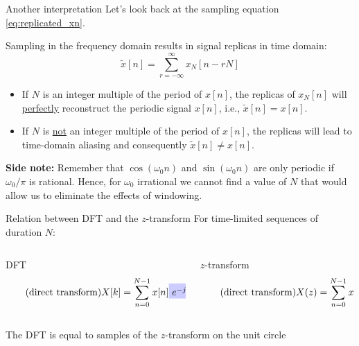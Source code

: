 \documentclass[10pt, handout]{beamer}
\begin{document}
%
\begin{frame}{Another interpretation}
	Let's look back at the sampling equation \eqref{eq:replicated_xn}. 

	Sampling in the frequency domain results in signal replicas in time domain:
	\begin{equation*}
	\tilde{x}[n] = \sum_{r=-\infty}^\infty x_N[n-rN]
	\end{equation*}
	
	\begin{itemize}
		\item If $N$ is an integer multiple of the period of $x[n]$, the replicas of $x_N[n]$ will \underline{perfectly} reconstruct the periodic signal $x[n]$, i.e., $\tilde{x}[n] = x[n]$.
		\item If $N$ is \underline{not} an integer multiple of the period of $x[n]$, the replicas will lead to time-domain aliasing and consequently $\tilde{x}[n]\neq x[n]$.
	\end{itemize}
	
	\vspace{0.25cm}	
	\textbf{Side note:} Remember that $\cos(\omega_0n)$ and $\sin(\omega_0n)$ are only periodic if $\omega_0/\pi$ is rational. Hence, for $\omega_0$ irrational we cannot find a value of $N$ that would allow us to eliminate the effects of windowing.
\end{frame}


%
\begin{frame}{Relation between DFT and the $z$-transform}
For time-limited sequences of duration $N$:
\vspace{-0.3cm}
\begin{columns}[t]
\begin{column}{0.5\textwidth}
	\begin{block}{DFT}
		\vspace{-0.3cm}
		\begin{equation} \tag{direct transform}
		X[k] = \sum_{n=0}^{N-1} x[n]\tikz[baseline]{
			\node[fill=blue!20,anchor=base] (t1) {$e^{-j(2\pi/N)kn}$};
		}
		\end{equation}
	\end{block}
\end{column}
\begin{column}{0.5\textwidth}
	\begin{block}{$z$-transform}
		\vspace{-0.3cm}
		\begin{equation} \tag{direct transform}
		X(z) = \sum_{n=0}^{N-1} x[n]\tikz[baseline]{
			\node[fill=blue!20,anchor=base] (t1) {$z^{-n}$};
		}
		\end{equation}
	\end{block}
\end{column}
\end{columns}
\vspace{0.5cm}
The DFT is equal to samples of the $z$-transform on the unit circle
\begin{figure}
\centering
\resizebox{0.5\linewidth}{!}{}
\label{fig:sampled_unit_circle}
\end{figure}
\end{frame}
\end{document}

